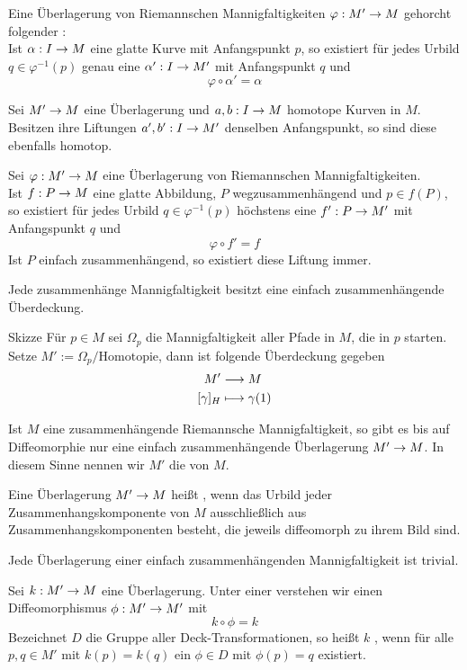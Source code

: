 \documentclass{book}
\renewcommand{\i}{^{-1}}
\begin{document}
\Lem{}
Eine Überlagerung von Riemannschen Mannigfaltigkeiten $\varphi : M' \overset{}{\rightarrow} M$ gehorcht folgender :\\
Ist $\alpha : I \overset{}{\rightarrow} M$ eine glatte Kurve mit Anfangspunkt $p$, so existiert für jedes Urbild $q \in \varphi\i(p)$ genau eine  $\alpha' : I \overset{}{\rightarrow} M'$ mit Anfangspunkt $q$ und
\[ \varphi \circ \alpha' = \alpha \]

\Lem{}
Sei $M' \overset{}{\rightarrow} M $ eine Überlagerung und $a,b : I \overset{}{\rightarrow} M$ homotope Kurven in $M$. Besitzen ihre Liftungen $a', b' : I \overset{}{\rightarrow} M'$ denselben Anfangspunkt, so sind diese ebenfalls homotop.

\Kor{}
Sei $\varphi : M' \overset{}{\rightarrow} M$ eine Überlagerung von Riemannschen Mannigfaltigkeiten.\\
Ist $f : P \overset{}{\rightarrow} M$ eine glatte Abbildung, $P$ wegzusammenhängend und $p \in f(P)$, so existiert für jedes Urbild $q \in \varphi\i(p)$ höchstens eine  $f' : P \overset{}{\rightarrow} M'$ mit Anfangspunkt $q$ und
\[ \varphi \circ f' = f \]
Ist $P$ einfach zusammenhängend, so existiert diese Liftung immer.

\Satz{}
Jede zusammenhänge Mannigfaltigkeit besitzt eine einfach zusammenhängende Überdeckung.
\begin{Beweis}{Skizze}
Für $p \in M$ sei $\Omega_p$ die Mannigfaltigkeit aller Pfade in $M$, die in $p$ starten. Setze $M' := \Omega_p / \text{Homotopie}$, dann ist folgende Überdeckung gegeben
\begin{align*}
M' & \overset{}{\longrightarrow} M\\
[\gamma]_H & \longmapsto \gamma(1)
\end{align*}
\end{Beweis}

\Kor{}
Ist $M$ eine zusammenhängende Riemannsche Mannigfaltigkeit, so gibt es bis auf Diffeomorphie nur eine einfach zusammenhängende Überlagerung $M' \overset{}{\rightarrow} M$. In diesem Sinne nennen wir $M'$ die  von $M$.

\Def{}
Eine Überlagerung $M' \overset{}{\rightarrow} M$ heißt , wenn das Urbild jeder Zusammenhangskomponente von $M$ ausschließlich aus Zusammenhangskomponenten besteht, die jeweils diffeomorph zu ihrem Bild sind.

\Kor{}
Jede Überlagerung einer einfach zusammenhängenden Mannigfaltigkeit ist trivial.

\Def{}
Sei $k : M' \overset{}{\rightarrow} M$ eine Überlagerung. Unter einer  verstehen wir einen Diffeomorphismus $\phi : M' \overset{}{\rightarrow} M'$ mit
\[ k \circ \phi = k \]
Bezeichnet $D$ die Gruppe aller Deck-Transformationen, so heißt $k$ , wenn für alle $p,q \in M'$ mit $k(p) = k(q)$ ein $\phi \in D$ mit $\phi(p) = q$ existiert.
\end{document}
